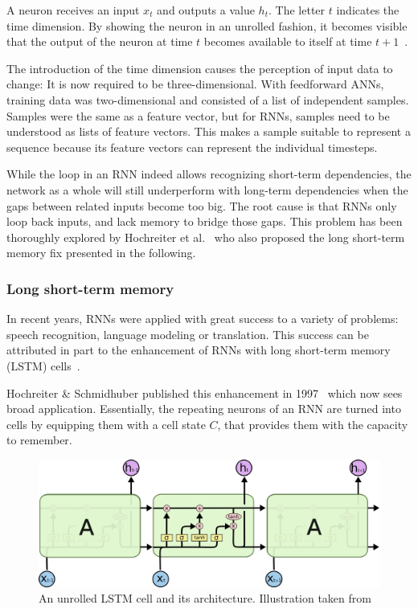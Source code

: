 A neuron receives an input $x_t$ and outputs a value $h_t$. The letter $t$ indicates the time dimension. By showing the neuron in an unrolled fashion, it becomes visible that the output of the neuron at time $t$ becomes available to itself at time $t+1$~\cite{web:colah}.

The introduction of the time dimension causes the perception of input data to change: It is now required to be three-dimensional. With feedforward ANNs, training data was two-dimensional and consisted of a list of independent samples. Samples were the same as a feature vector, but for RNNs, samples need to be understood as lists of feature vectors. This makes a sample suitable to represent a sequence because its feature vectors can represent the individual timesteps.

While the loop in an RNN indeed allows recognizing short-term dependencies, the network as a whole will still underperform with long-term dependencies when the gaps between related inputs become too big. The root cause is that RNNs only loop back inputs, and lack memory to bridge those gaps. This problem has been thoroughly explored by Hochreiter et al.~\cite{hochreiter1991untersuchungen} who also proposed the long short-term memory fix presented in the following.

\subsubsection*{Long short-term memory}\label{sec:lstm}
In recent years, RNNs were applied with great success to a variety of problems: speech recognition, language modeling or translation. This success can be attributed in part to the enhancement of RNNs with long short-term memory (LSTM) cells~\cite{jozefowicz2015empirical,kuhn2013applied,schmidhuber2015deep}.

Hochreiter \& Schmidhuber published this enhancement in 1997~\cite{hochreiter1997} which now sees broad application. Essentially, the repeating neurons of an RNN are turned into cells by equipping them with a cell state $C$, that provides them with the capacity to remember.

\begin{figure}[!htb]
    \centering
    \includegraphics[width=\textwidth]{gfx/lstm-chain.png}
    \caption[An unrolled LSTM cell and its architecture]{An unrolled LSTM cell and its architecture. Illustration taken from~\cite{web:colah}}
    \label{fig:lstm}
\end{figure}

